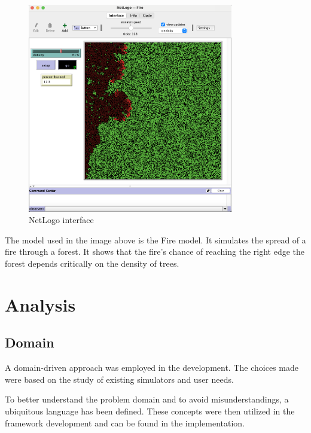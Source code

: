 \documentclass[12pt,a4paper,openright,twoside]{book}
\begin{document}
\begin{figure}[h!]
  \centering
  \includegraphics[width=0.8\textwidth]{figures/NetLogo-interface.png}
  \caption{NetLogo interface}
\end{figure}

The model used in the image above is the Fire model.
It simulates the spread of a fire through a forest. It shows that the fire's chance of reaching the right edge the forest depends critically on the density of trees.

\chapter{Analysis}

\section{Domain}

A domain-driven approach was employed in the development. The choices made were based on the study of existing simulators and user needs.

To better understand the problem domain and to avoid misunderstandings, a ubiquitous language has been defined.
These concepts were then utilized in the framework development and can be found in the implementation.
\end{document}
